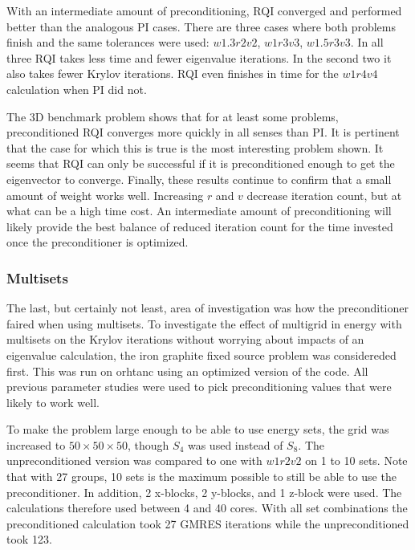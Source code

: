 With an intermediate amount of preconditioning, RQI converged and performed better than the analogous PI cases. There are three cases where both problems finish and the same tolerances were used: $w1.3r2v2$, $w1r3v3$, $w1.5r3v3$. In all three RQI takes less time and fewer eigenvalue iterations. In the second two it also takes fewer Krylov iterations. RQI even finishes in time for the $w1r4v4$ calculation when PI did not. 

The 3D benchmark problem shows that for at least some problems, preconditioned RQI converges more quickly in all senses than PI. It is pertinent that the case for which this is true is the most interesting problem shown. It seems that RQI can only be successful if it is preconditioned enough to get the eigenvector to converge. Finally, these results continue to confirm that a small amount of weight works well. Increasing $r$ and $v$ decrease iteration count, but at what can be a high time cost. An intermediate amount of preconditioning will likely provide the best balance of reduced iteration count for the time invested once the preconditioner is optimized. 

\subsubsection{Multisets}
The last, but certainly not least, area of investigation was how the preconditioner faired when using multisets. To investigate the effect of multigrid in energy with multisets on the Krylov iterations without worrying about impacts of an eigenvalue calculation, the iron graphite fixed source problem was considereded first. This was run on orhtanc using an optimized version of the code. All previous parameter studies were used to pick preconditioning values that were likely to work well. 

To make the problem large enough to be able to use energy sets, the grid was increased to $50 \times 50 \times 50$, though $S_{4}$ was used instead of $S_{8}$. The unpreconditioned version was compared to one with $w1r2v2$ on 1 to 10 sets. Note that with 27 groups, 10 sets is the maximum possible to still be able to use the preconditioner. In addition, 2 x-blocks, 2 y-blocks, and 1 z-block were used. The calculations therefore used between 4 and 40 cores. With all set combinations the preconditioned calculation took 27 GMRES iterations while the unpreconditioned took 123.

